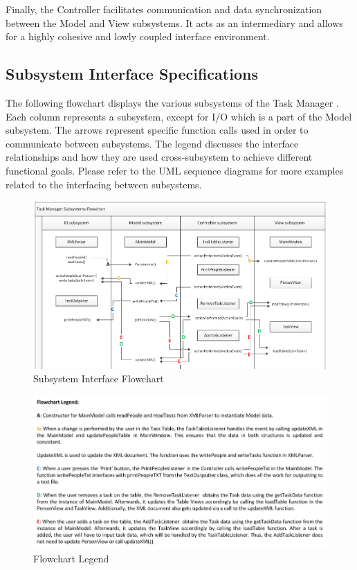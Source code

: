 \documentclass[12pt]{article}
\newcommand{\systemName}{Task Manager }
\begin{document}
Finally, the Controller facilitates communication and data synchronization between the Model and View subsystems. It acts as an intermediary and allows for a highly cohesive and lowly coupled interface environment. 

\subsection{Subsystem Interface Specifications}

The following flowchart displays the various subsystems of the \systemName. Each column represents a subsystem, except for I/O which is a part of the Model subsystem. The arrows represent specific function calls used in order to communicate between subsystems. The legend discusses the interface relationships and how they are used cross-subsystem to achieve different functional goals. Please refer to the UML sequence diagrams for more examples related to the interfacing between subsystems.

\begin{figure}[htbp]
\begin{center} \includegraphics[scale=.6]{Diagrams/subsystem_flowchart.png} \end{center}
\caption{Subsystem Interface Flowchart}
\label{fig:sub-flow-diagram}
\end{figure}

\begin{figure}[htbp]
\begin{center} \includegraphics[scale=.65]{Diagrams/legend.png} \end{center}
\caption{Flowchart Legend}
\label{fig:legend}
\end{figure}
\end{document}
